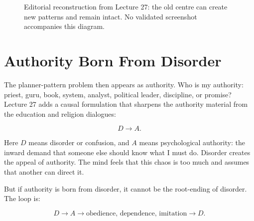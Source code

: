 \documentclass[11pt,oneside]{book}
\begin{document}
\begin{figure}
\centering
{}
\caption{Editorial reconstruction from Lecture 27: the old centre can create new patterns and remain intact. No validated screenshot accompanies this diagram.}
\end{figure}

\section{Authority Born From Disorder}

The planner-pattern problem then appears as authority. Who is my authority: priest, guru, book, system, analyst, political leader, discipline, or promise? Lecture 27 adds a causal formulation that sharpens the authority material from the education and religion dialogues:

\begin{equation}
D \longrightarrow A.
\end{equation}

Here \(D\) means disorder or confusion, and \(A\) means psychological authority: the inward demand that someone else should know what I must do. Disorder creates the appeal of authority. The mind feels that this chaos is too much and assumes that another can direct it.

But if authority is born from disorder, it cannot be the root-ending of disorder. The loop is:

\begin{equation}
D
\longrightarrow
A
\longrightarrow
\text{obedience, dependence, imitation}
\longrightarrow
D.
\end{equation}
\end{document}
